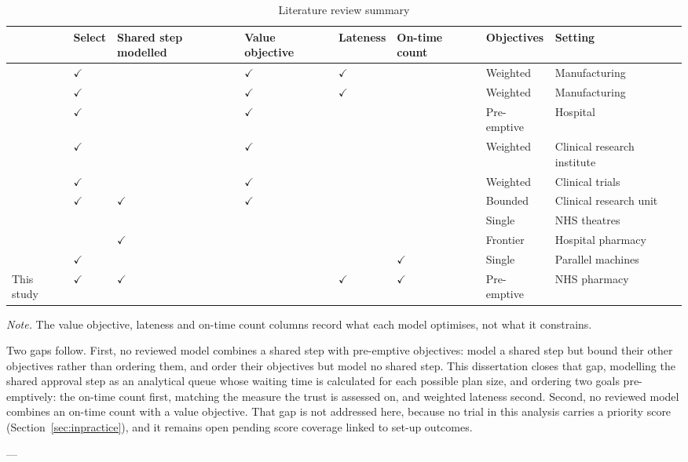 \begin{table}[htbp]
  \centering
  \caption{Literature review summary}
  \label{tab:litsummary}
  \begin{tabularx}{\textwidth}{@{}lLLLLLLL@{}}
    \toprule
    \textbf{} & \textbf{Select} & \textbf{Shared step modelled} & \textbf{Value objective} & \textbf{Lateness} & \textbf{On-time count} & \textbf{Objectives} & \textbf{Setting} \\
    \midrule
    \citet{SlotnickMorton2007OrderAcceptance} & $\checkmark$ &  & $\checkmark$ & $\checkmark$ &  & Weighted & Manufacturing \\
    \addlinespace
    \citet{LewisSlotnick2002MultiPeriod} & $\checkmark$ &  & $\checkmark$ & $\checkmark$ &  & Weighted & Manufacturing \\
    \addlinespace
    \citet{BlakeCarter2002GP} & $\checkmark$ &  & $\checkmark$ &  &  & Pre-emptive & Hospital \\
    \addlinespace
    \citet{Munoz2018ProposalSelection} & $\checkmark$ &  & $\checkmark$ &  &  & Weighted & Clinical research institute \\
    \addlinespace
    \citet{Qi2022EquitableEnrolment} & $\checkmark$ &  & $\checkmark$ &  &  & Weighted & Clinical trials \\
    \addlinespace
    \citet{DegliseHawkinson2020CAPTAIN} & $\checkmark$ & $\checkmark$ & $\checkmark$ &  &  & Bounded & Clinical research unit \\
    \addlinespace
    \citet{Kheiri2021Theatre} &  &  &  &  &  & Single & NHS theatres \\
    \addlinespace
    \citet{Svirsko2022Medication} &  & $\checkmark$ &  &  &  & Frontier & Hospital pharmacy \\
    \addlinespace
    \citet{AtsmonyMosheiov2023OnTime} & $\checkmark$ &  &  &  & $\checkmark$ & Single & Parallel machines \\
    \addlinespace
    This study & $\checkmark$ & $\checkmark$ &  & $\checkmark$ & $\checkmark$ & Pre-emptive & NHS pharmacy \\
    \bottomrule
  \end{tabularx}
\end{table}

\noindent\footnotesize \emph{Note.} The value objective, lateness and on-time count columns record what each model optimises, not what it constrains.\normalsize

Two gaps follow. First, no reviewed model combines a shared step with pre-emptive objectives: \citet{DegliseHawkinson2020CAPTAIN} model a shared step but bound their other objectives rather than ordering them, and \citet{BlakeCarter2002GP} order their objectives but model no shared step. This dissertation closes that gap, modelling the shared approval step as an analytical queue whose waiting time is calculated for each possible plan size, and ordering two goals pre-emptively: the on-time count first, matching the measure the trust is assessed on, and weighted lateness second. Second, no reviewed model combines an on-time count with a value objective. That gap is not addressed here, because no trial in this analysis carries a priority score (Section~\ref{sec:inpractice}), and it remains open pending score coverage linked to set-up outcomes.

---

